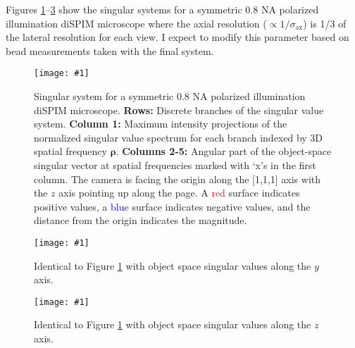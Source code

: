 \documentclass[11pt]{article}
\providecommand{\bs}[1]{\boldsymbol{#1}}
\providecommand{\fig}[4]{
\begin{figure}[h]
 \captionsetup{width=1.0\linewidth}
 \centering
 \texttt{[image: \#1]}
 \caption{#3}
 \label{fig:#4}
\end{figure}
}
\begin{document}
Figures \ref{fig:sysx}--\ref{fig:sysz} show the singular systems for a symmetric
0.8 NA polarized illumination diSPIM microscope where the axial resolution
($\propto 1/\sigma_{\text{ax}}$) is 1/3 of the lateral resolution for each view.
I expect to modify this parameter based on bead measurements taken with the
final system.

\fig{../calculations/multi-out/SVS3Dx.pdf}{0.95}{Singular system for a symmetric
  0.8 NA polarized illumination diSPIM microscope. \textbf{Rows:} Discrete
  branches of the singular value system. \textbf{Column 1:} Maximum intensity
  projections of the normalized singular value spectrum for each branch indexed
  by 3D spatial frequency $\bs{\rho}$. \textbf{Columns 2-5:} Angular part of the
  object-space singular vector at spatial frequencies marked with `x's in the
  first column. The camera is facing the origin along the [1,1,1] axis with the
  $z$ axis pointing up along the page. A \textcolor{red}{red} surface indicates
  positive values, a \textcolor{blue}{blue} surface indicates negative values,
  and the distance from the origin indicates the magnitude.}{sysx}

\fig{../calculations/multi-out/SVS3Dy.pdf}{1.0}{Identical to Figure
  \ref{fig:sysx} with object space singular values along the $y$ axis.}{sysy}

\fig{../calculations/multi-out/SVS3Dz.pdf}{1.0}{Identical to Figure
  \ref{fig:sysx} with object space singular values along the $z$ axis.}{sysz}


{}

\end{document}
